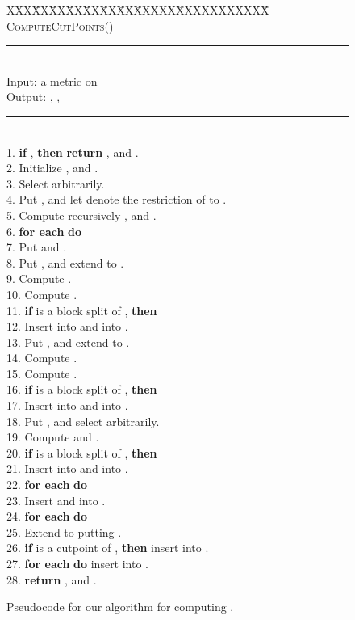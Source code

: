 \documentclass[12pt]{article}
\begin{document}
\begin{figure}
\begin{tabbing}
XXX\= XX\= XX\=  XX\= XX\= XX\= XX\=  XXXXX\=  XXXXXXXXXXX\= \kill \\
{\large \textsc{ComputeCutPoints}()}\\
\rule{13cm}{0.5pt}\\
Input: \> \> \>a metric  on \\
Output: \> \> \>, , \\
\rule{13cm}{0.5pt}\\
1. \> \textbf{if} , \textbf{then} \textbf{return} ,
       and .\\
2. \> Initialize ,  and .\\
3. \> Select  arbitrarily.\\
4. \> Put , and let  denote the restriction of  to .\\
5. \> Compute recursively ,  and .\\
6. \> \textbf{for each}  \textbf{do}\\
7. \> \> Put  and .\\
8. \> \> Put ,  and extend  to .\\
9. \> \> Compute .\\
10. \> \> Compute .\\
11. \> \> \textbf{if}  is a block split of , \textbf{then}\\
12. \> \> \> Insert  into  and  into .\\
13. \> \> Put ,  and extend  to .\\
14. \> \> Compute .\\
15. \> \> Compute .\\
16. \> \> \textbf{if}  is a block split of , \textbf{then}\\ 
17. \> \> \> Insert  into  and  into .\\
18. \> Put ,  and select  arbitrarily.\\
19. \> Compute  and .\\
20. \> \textbf{if}  is a block split of , \textbf{then}\\
21. \> \> Insert  into  and  into .\\ 
22. \> \textbf{for each}  \textbf{do}\\
23. \> \> Insert  and  into .\\
24. \> \textbf{for each}  \textbf{do}\\
25. \> \> Extend  to  putting .\\
26. \> \> \textbf{if}  is a cutpoint of , 
         \textbf{then} insert  into .\\
27. \> \textbf{for each}  \textbf{do} insert  into .\\
28. \> \textbf{return} ,  and .
\end{tabbing}
\caption{Pseudocode for our algorithm for computing .}
\label{algorithm:cut:points}
\end{figure}
\end{document}
